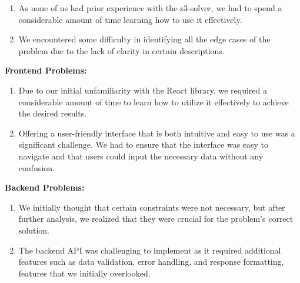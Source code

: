 \documentclass[a4paper, 11pt]{article}
\begin{document}
\begin{enumerate}
	\item As none of us had prior experience with the z3-solver, we had to spend a considerable amount of time learning how to use it effectively.
	\item We encountered some difficulty in identifying all the edge cases of the problem due to the lack of clarity in certain descriptions.
\end{enumerate}

\textbf{Frontend Problems:}

\begin{enumerate}
	\item Due to our initial unfamiliarity with the React library, we required a considerable amount of time to learn how to utilize it effectively to achieve the desired results.
	\item Offering a user-friendly interface that is both intuitive and easy to use was a significant challenge. We had to ensure that the interface was easy to navigate and that users could input the necessary data without any confusion.
\end{enumerate}

\textbf{Backend Problems:}

\begin{enumerate}
	\item We initially thought that certain constraints were not necessary, but after further analysis, we realized that they were crucial for the problem's correct solution.
	\item The backend API was challenging to implement as it required additional features such as data validation, error handling, and response formatting, features that we initially overlooked.
\end{enumerate}
\end{document}
